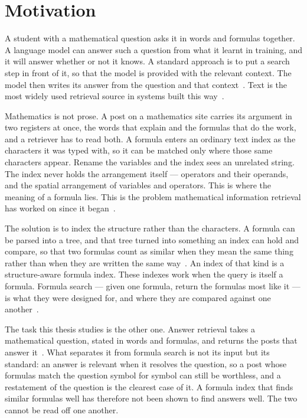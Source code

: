 \section{Motivation}\label{sec:intro-motivation}

A student with a mathematical question asks it in words and formulas together. A language model can
answer such a question from what it learnt in training, and it will answer whether or not it knows.
A standard approach is to put a search step in front of it, so that the model is provided with the
relevant context. The model then writes its answer from the question and that
context~\cite{lewis2020rag}. Text is the most widely used retrieval source in
systems built this way~\cite{gao2024ragsurvey}.

Mathematics is not prose. A post on a mathematics site carries its argument in two registers at
once, the words that explain and the formulas that do the work, and a retriever has to read both. A
formula enters an ordinary text index as the characters it was typed with, so it can be matched only
where those same characters appear. Rename the variables and the index sees an unrelated string.
The index never holds the arrangement itself --- operators and their operands, and the spatial
arrangement of variables and operators. This is where the meaning of a formula lies. This is the
problem mathematical information retrieval has worked on since it began~\cite{dadure2024mirreview}.

The solution is to index the structure rather than the characters. A formula can be parsed into a
tree, and that tree turned into something an index can hold and compare, so that two formulas count
as similar when they mean the same thing rather than when they are written the same
way~\cite{davila2017tangents,mansouri2019tangentcft}. An index of that kind is a structure-aware
formula index. These indexes work when the query is itself a formula. Formula search --- given one
formula, return the formulas most like it --- is what they were designed for, and where they are
compared against one another~\cite{mansouri2022arqmath3}.

The task this thesis studies is the other one. Answer retrieval takes a mathematical question,
stated in words and formulas, and returns the posts that answer it~\cite{zanibbi2020arqmath}. What
separates it from formula search is not its input but its standard: an answer is relevant when it
resolves the question, so a post whose formulas match the question symbol for symbol can still be
worthless, and a restatement of the question is the clearest case of it. A formula index that finds
similar formulas well has therefore not been shown to find answers well. The two cannot be read off
one another.

